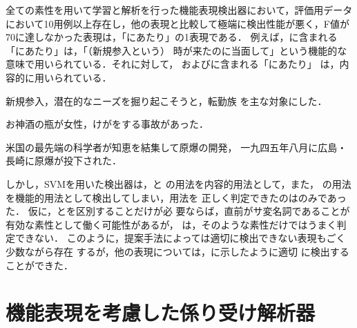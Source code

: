 \documentclass[japanese]{jnlp_1.3e}
\renewcommand{\underline}[1]{}
\begin{document}
全ての素性を用いて学習と解析を行った機能表現検出器において，評価用データ
において10用例以上存在し，他の表現と比較して極端に検出性能が悪く，F値が
70に達しなかった表現は，「にあたり」の1表現である．
例えば，に含まれる「にあたり」は，「（新規参入という） 
時が来たのに当面して」という機能的な意味で用いられている．それに対して，
およびに含まれる「にあたり」
は，内容的に用いられている．
\begin{example}
  \item 新規参入\underline{にあたり}，潜在的なニーズを掘り起こそうと，転勤族
	を主な対象にした．\label{ex:niatari-F} 
  \item お神酒の瓶が女性\underline{にあたり}，けがをする事故があった．
	\label{ex:niatari-C} 
  \item 米国の最先端の科学者が知恵を結集して原爆の開発\underline{にあたり}，
	一九四五年八月に広島・長崎に原爆が投下された．
	\label{ex:niatari-C2} 
\end{example}
しかし，SVMを用いた検出器は，と
の用法を内容的用法として，また，
の用法を機能的用法として検出してしまい，用法を
正しく判定できたのはのみであった．
仮に，とを区別することだけが必
要ならば，直前がサ変名詞であることが有効な素性として働く可能性があるが，
は，そのような素性だけではうまく判定できない．
このように，提案手法によっては適切に検出できない表現もごく少数ながら存在
するが，他の表現については，に示したように適切
に検出することができた．


\section{機能表現を考慮した係り受け解析器}
\label{sec:係り受け解析}
\end{document}
